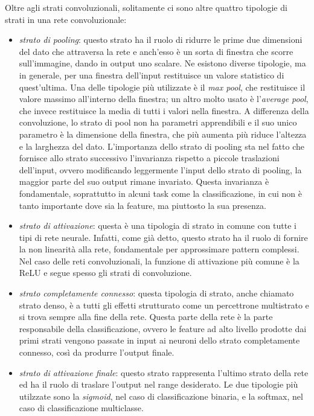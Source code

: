 Oltre agli strati convoluzionali, solitamente ci sono altre quattro tipologie di strati in una rete convoluzionale:
\begin{itemize}
    \item \textit{strato di pooling}: questo strato ha il ruolo di ridurre le prime due dimensioni del dato che attraversa la rete e anch'esso è un sorta di finestra che scorre sull'immagine, dando in output uno scalare. Ne esistono diverse tipologie, ma in generale, per una finestra dell'input restituisce un valore statistico di quest'ultima. Una delle tipologie più utilizzate è il \textit{max pool}, che restituisce il valore massimo all'interno della finestra; un altro molto usato è l'\textit{average pool}, che invece restituisce la media di tutti i valori nella finestra. A differenza della convoluzione, lo strato di pool non ha parametri apprendibili e il suo unico parametro è la dimensione della finestra, che più aumenta più riduce l'altezza e la larghezza del dato. L'importanza dello strato di pooling sta nel fatto che fornisce allo strato successivo l'invarianza rispetto a piccole traslazioni dell'input, ovvero modificando leggermente l'input dello strato di pooling, la maggior parte del suo output rimane invariato. Questa invarianza è fondamentale, soprattutto in alcuni task come la classificazione, in cui non è tanto importante dove sia la feature, ma piuttosto la sua presenza.
    
    \item \textit{strato di attivazione}: questa è una tipologia di strato in comune con tutte i tipi di rete neurale. Infatti, come già detto, questo strato ha il ruolo di fornire la non linearità alla rete, fondamentale per approssimare pattern complessi. Nel caso delle reti convoluzionali, la funzione di attivazione più comune è la ReLU e segue spesso gli strati di convoluzione.
    
    \item \textit{strato completamente connesso}: questa tipologia di strato, anche chiamato strato denso, è a tutti gli effetti strutturato come un percettrone multistrato e si trova sempre alla fine della rete. Questa parte della rete è la parte responsabile della classificazione, ovvero le feature ad alto livello prodotte dai primi strati vengono passate in input ai neuroni dello strato completamente connesso, così da produrre l'output finale.
    
    \item \textit{strato di attivazione finale}: questo strato rappresenta l'ultimo strato della rete ed ha il ruolo di traslare l'output nel range desiderato. Le due tipologie più utilzzate sono la \textit{sigmoid}, nel caso di classificazione binaria, e la softmax, nel caso di classificazione multiclasse.
\end{itemize}



